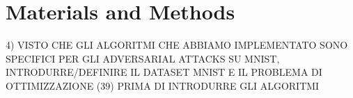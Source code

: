 \section{Materials and Methods}
4) VISTO CHE GLI ALGORITMI CHE ABBIAMO IMPLEMENTATO SONO SPECIFICI PER GLI ADVERSARIAL ATTACKS SU MNIST, INTRODURRE/DEFINIRE IL DATASET MNIST E IL PROBLEMA DI OTTIMIZZAZIONE (39) PRIMA DI INTRODURRE GLI ALGORITMI